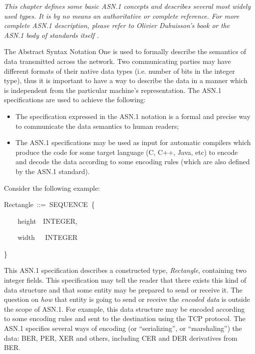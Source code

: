 \documentclass[english,oneside,12pt]{book}
\newenvironment{lyxcode}
{\par\begin{list}{}{
\setlength{\rightmargin}{\leftmargin}
\setlength{\listparindent}{0pt}%
\raggedright
\setlength{\itemsep}{0pt}
\setlength{\parsep}{0pt}
\normalfont\ttfamily}%
 \item[]}
{\end{list}}
\begin{document}
\emph{This chapter defines some basic ASN.1 concepts and describes
several most widely used types. It is by no means an authoritative
or complete reference. For more complete ASN.1 description, please
refer to Olivier Dubuisson's book \cite{Dub00} or the ASN.1 body
of standards itself \cite{ITU-T/ASN.1}.}

The Abstract Syntax Notation One is used to formally describe the
semantics of data transmitted across the network. Two communicating
parties may have different formats of their native data types (i.e.
number of bits in the integer type), thus it is important to have
a way to describe the data in a manner which is independent from the
particular machine's representation. The ASN.1 specifications are
used to achieve the following:
\begin{itemize}
\item The specification expressed in the ASN.1 notation is a formal and
precise way to communicate the data semantics to human readers;
\item The ASN.1 specifications may be used as input for automatic compilers
which produce the code for some target language (C, C++, Java, etc)
to encode and decode the data according to some encoding rules (which
are also defined by the ASN.1 standard).
\end{itemize}
Consider the following example:
\begin{lyxcode}
Rectangle~::=~SEQUENCE~\{

~~~~height~~INTEGER,

~~~~width~~~INTEGER

\}
\end{lyxcode}
This ASN.1 specification describes a constructed type, \emph{Rectangle},
containing two integer fields. This specification may tell the reader
that there exists this kind of data structure and that some entity
may be prepared to send or receive it. The question on \emph{how}
that entity is going to send or receive the \emph{encoded data} is
outside the scope of ASN.1. For example, this data structure may be
encoded according to some encoding rules and sent to the destination
using the TCP protocol. The ASN.1 specifies several ways of encoding
(or ``serializing'', or ``marshaling'') the data: BER, PER, XER
and others, including CER and DER derivatives from BER.
\end{document}
